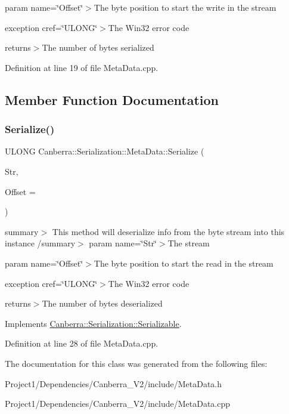 param name=\char`\"{}\+Offset\char`\"{}$>$The byte position to start the write in the stream

exception cref=\char`\"{}\+U\+L\+O\+N\+G\char`\"{}$>$The Win32 error code

returns$>$The number of bytes serialized

Definition at line 19 of file Meta\+Data.\+cpp.



\subsection{Member Function Documentation}
\mbox{\label{class_canberra_1_1_serialization_1_1_meta_data_a2699805d188817a8e62446b4119615dc_a2699805d188817a8e62446b4119615dc}} 
\subsubsection{\texorpdfstring{Serialize()}{Serialize()}}
{\footnotesize\ttfamily U\+L\+O\+NG Canberra\+::\+Serialization\+::\+Meta\+Data\+::\+Serialize (\begin{DoxyParamCaption}\item[{\hyperlink{class_canberra_1_1_utility_1_1_core_1_1_byte_stream}{Canberra\+::\+Utility\+::\+Core\+::\+Byte\+Stream} \&}]{Str,  }\item[{const L\+O\+NG}]{Offset = {} }\end{DoxyParamCaption})\hspace{0.3cm}{\ttfamily [virtual]}}

summary$>$ This method will deserialize info from the byte stream into this instance /summary$>$ param name=\char`\"{}\+Str\char`\"{}$>$The stream

param name=\char`\"{}\+Offset\char`\"{}$>$The byte position to start the read in the stream

exception cref=\char`\"{}\+U\+L\+O\+N\+G\char`\"{}$>$The Win32 error code

returns$>$The number of bytes deserialized

Implements \hyperlink{class_canberra_1_1_serialization_1_1_serializable}{Canberra\+::\+Serialization\+::\+Serializable}.



Definition at line 28 of file Meta\+Data.\+cpp.



The documentation for this class was generated from the following files\+:\begin{DoxyCompactItemize}
\item 
Project1/\+Dependencies/\+Canberra\+\_\+\+V2/include/Meta\+Data.\+h\item 
Project1/\+Dependencies/\+Canberra\+\_\+\+V2/include/Meta\+Data.\+cpp\end{DoxyCompactItemize}
